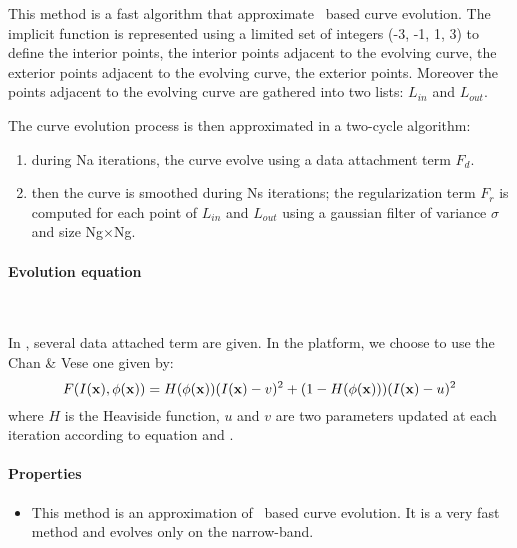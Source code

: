 \hspace{0.7cm} This method is a fast algorithm that approximate \ls~based curve evolution. The implicit function is represented using a limited set of integers (-3, -1, 1, 3) to define the interior points, the interior points adjacent to the evolving curve, the exterior points adjacent to the evolving curve, the exterior points. Moreover the points adjacent to the evolving curve are gathered into two lists: $L_{in}$ and $L_{out}$.
\vspace{0.3cm}

The curve evolution process is then approximated in a two-cycle algorithm:
\begin{enumerate}
	\item during Na iterations, the curve evolve using a data attachment term $F_d$.
	\item then the curve is smoothed during Ns iterations; the regularization term $F_r$ is computed for each point of $L_{in}$ and $L_{out}$ using a gaussian filter of variance $\sigma$ and size Ng$\times$Ng.
\end{enumerate}

\paragraph{Evolution equation}
~\par \vspace{0.3cm}
In \cite{Shi2008}, several data attached term are given. In the platform, we choose to use the Chan \& Vese one given by:
\begin{equation}
	\label{eq:F_shi}
	F(I(\mathbf{x}),\phi(\mathbf{x})) = H(\phi(\mathbf{x}))(I(\mathbf{x}) - v)^2 + (1 - H(\phi(\mathbf{x})))(I(\mathbf{x}) - u)^2
\end{equation}
where $H$ is the Heaviside function, $u$ and $v$ are two parameters updated at each iteration according to equation  and .

\paragraph{Properties}

\begin{itemize}
	\item This method is an approximation of \ls~based curve evolution. It is a very fast method and evolves only on the narrow-band.
\end{itemize}
